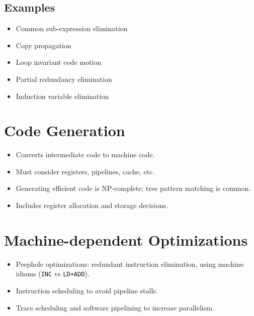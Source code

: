 \documentclass[12pt,a4paper]{article}
\begin{document}
\subsection*{Examples}
\begin{itemize}
    \item Common sub-expression elimination
    \item Copy propagation
    \item Loop invariant code motion
    \item Partial redundancy elimination
    \item Induction variable elimination
\end{itemize}

\section*{Code Generation}
\begin{itemize}
    \item Converts intermediate code to machine code.
    \item Must consider registers, pipelines, cache, etc.
    \item Generating efficient code is NP-complete; tree pattern matching is common.
    \item Includes register allocation and storage decisions.
\end{itemize}

\section*{Machine-dependent Optimizations}
\begin{itemize}
    \item Peephole optimizations: redundant instruction elimination, using machine idioms (\texttt{INC} vs \texttt{LD+ADD}).
    \item Instruction scheduling to avoid pipeline stalls.
    \item Trace scheduling and software pipelining to increase parallelism.
\end{itemize}
\end{document}
